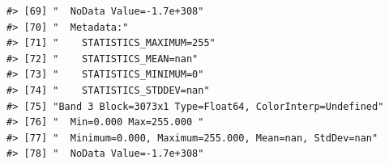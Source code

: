 \documentclass[
]{book}
\begin{document}
\begin{verbatim}
#> [69] "  NoData Value=-1.7e+308"                                                                                                                                                                                                                                                       
#> [70] "  Metadata:"                                                                                                                                                                                                                                                                    
#> [71] "    STATISTICS_MAXIMUM=255"                                                                                                                                                                                                                                                     
#> [72] "    STATISTICS_MEAN=nan"                                                                                                                                                                                                                                                        
#> [73] "    STATISTICS_MINIMUM=0"                                                                                                                                                                                                                                                       
#> [74] "    STATISTICS_STDDEV=nan"                                                                                                                                                                                                                                                      
#> [75] "Band 3 Block=3073x1 Type=Float64, ColorInterp=Undefined"                                                                                                                                                                                                                        
#> [76] "  Min=0.000 Max=255.000 "                                                                                                                                                                                                                                                       
#> [77] "  Minimum=0.000, Maximum=255.000, Mean=nan, StdDev=nan"                                                                                                                                                                                                                         
#> [78] "  NoData Value=-1.7e+308"                                                                                                                                                                                                                                                       

\end{verbatim}
\end{document}
